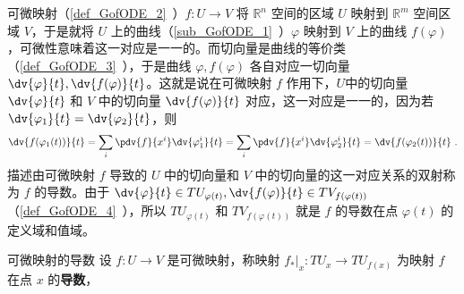 
可微映射（\autoref{def_GofODE_2}~）$f:U\rightarrow V$ 将 $\mathbb R^n$ 空间的区域 $U$ 映射到 $\mathbb R^m$ 空间区域 $V$，于是就将 $U$ 上的曲线（\autoref{sub_GofODE_1}~）$\varphi$ 映射到 $V$ 上的曲线 $f(\varphi)$，可微性意味着这一对应是一一的。而切向量是曲线的等价类（\autoref{def_GofODE_3}~），于是曲线 $\varphi,f(\varphi)$ 各自对应一切向量 $\dv{\varphi}{t},\dv{f(\varphi)}{t}$。这就是说在可微映射 $f$ 作用下，$U$中的切向量 $\dv{\varphi}{t}$ 和 $V$ 中的切向量 $\dv{f(\varphi)}{t}$ 对应，这一对应是一一的，因为若 $\dv{\varphi_1}{t}=\dv{\varphi_2}{t}$，则
\begin{equation}
\dv{f(\varphi_1(t))}{t}=\sum_i\pdv{f}{x^i}\dv{\varphi^i_1}{t}=\sum_i\pdv{f}{x^i}\dv{\varphi^i_2}{t}=\dv{f(\varphi_2(t))}{t}~.
\end{equation}
描述由可微映射 $f$ 导致的 $U$ 中的切向量和 $V$ 中的切向量的这一对应关系的双射称为 $f$ 的导数。由于 $\dv{\varphi}{t}\in TU_{\varphi(t)} ,\dv{f(\varphi)}{t}\in TV_{f(\varphi(t))}$ （\autoref{def_GofODE_4}~），所以 $TU_{\varphi(t)}$ 和 $TV_{f(\varphi(t))}$ 就是 $f$ 的导数在点 $\varphi(t)$ 的定义域和值域。

\begin{definition}{可微映射的导数}
设 $f:U\rightarrow V$ 是可微映射，称映射 $f_*|_x:TU_x\rightarrow TU_{f(x)}$ 为映射 $f$ 在点 $x$ 的\textbf{导数}，
\end{definition}
